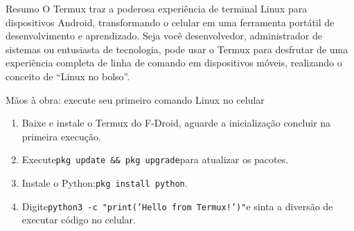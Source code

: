 \begin{tcbinfo}{Resumo}
O Termux traz a poderosa experiência de terminal Linux para dispositivos Android, transformando o celular em uma ferramenta portátil de desenvolvimento e aprendizado. Seja você desenvolvedor, administrador de sistemas ou entusiasta de tecnologia, pode usar o Termux para desfrutar de uma experiência completa de linha de comando em dispositivos móveis, realizando o conceito de “Linux no bolso”.

\end{tcbinfo}

\begin{tcbpractice}{Mãos à obra: execute seu primeiro comando Linux no celular}
\begin{enumerate}
  \item Baixe e instale o Termux do F-Droid, aguarde a inicialização concluir na primeira execução.
  \item Execute\texttt{pkg update \&\& pkg upgrade}para atualizar os pacotes.
  \item Instale o Python:\texttt{pkg install python}.
  \item Digite\texttt{python3 -\allowbreak c "print('Hello from Termux!')"}e sinta a diversão de executar código no celular.
\end{enumerate}

\end{tcbpractice}

